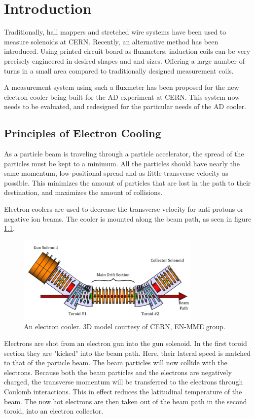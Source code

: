 \chapter{Introduction}
Traditionally, hall mappers and stretched wire systems have been
used to measure solenoids at CERN. Recently, an alternative method
has been introduced. Using printed circuit board as fluxmeters,
induction coils can be very precisely engineered in desired shapes
and and sizes. Offering a large number of turns in a small area
compared to traditionally designed measurement coils.
\cite{inductioncoilmeas}

A measurement system using such a fluxmeter has been proposed for
the new electron cooler being built for the AD experiment at CERN.
This system now needs to be evaluated, and redesigned for the 
particular needs of the AD cooler.


\section{Principles of Electron Cooling}
As a particle beam is traveling through a particle accelerator, the spread
of the particles must be kept to a minimum. All the particles should have
nearly the same momentum, low positional spread and as little transverse
velocity as possible. This minimizes the amount of particles that are lost
in the path to their destination, and maximizes the amount of collisions.

Electron coolers are used to decrease the transverse velocity for anti protons
or negative ion beams. The cooler is mounted along the beam path, as seen in
figure \ref{fig:ecooler}.

\begin{figure}[!h]
    \centering
    \includegraphics[width=0.8\textwidth]{figs/ecooler}
    \caption{An electron cooler. 3D model courtesy of CERN, EN-MME group.}
    \label{fig:ecooler}
\end{figure}

Electrons are shot from an electron gun into the gun solenoid. In the
first toroid section they are "kicked" into the beam path. Here, their
lateral speed is matched to that of the particle beam. The beam particles
will now collide with the electrons. Because both the beam particles and
the electrons are negatively charged, the transverse momentum will be
transferred to the electrons through Coulomb interactions. This in effect
reduces the latitudinal temperature of the beam. The now hot electrons are
then taken out of the beam path in the second toroid, into an electron collector.

